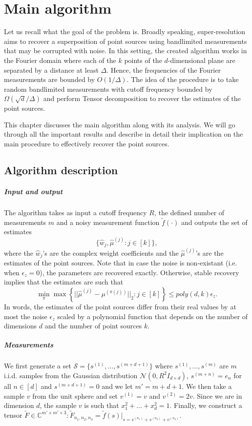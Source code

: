 \chapter{Main algorithm}
Let us recall what the goal of the problem is. Broadly speaking, super-resolution aims to recover a superposition of point sources using bandlimited measurements that may be corrupted with noise. In this setting, the created algorithm works in the Fourier domain where each of the $k$ points of the $d$-dimensional plane are separated by a distance at least $\Delta$. Hence, the frequencies of the Fourier measurements are bounded by $O(1/\Delta)$. The idea of the procedure is to take random bandlimited measurements with cutoff frequency bounded by $\Omega(\sqrt{d}/\Delta)$ and perform Tensor decomposition to recover the estimates of the point sources.\par 
This chapter discusses the main algorithm along with its analysis. We will go through all the important results and describe in detail their implication on the main procedure to effectively recover the point sources.

\section{Algorithm description}
\paragraph{Input and output} The algorithm takes as input a cutoff frequency $R$, the defined number of measurements $m$ and a noisy measurement function $\tilde{f}(\cdot)$ and outputs the set of estimates $$\{\widehat{w}_j,\widehat{\mu}^{(j)}:j\in[k]\},$$ where the $\widehat{w}_j$'s are the complex weight coefficients and the $\widehat{\mu}^{(j)}$'s are the estimates of the point sources. Note that in case the noise is non-existant (i.e. when $\epsilon_z=0$), the parameters are recovered exactly. Otherwise, stable recovery implies that the estimates are such that $$\min_\pi\max\left\{||\widehat{\mu}^{(j)}-\mu^{(\pi(j))}||_2:j\in[k]\right\}\leq poly(d,k)\epsilon_z.$$ In words, the estimates of the point sources differ from their real values by at most the noise $\epsilon_z$ scaled by a polynomial function that depends on the number of dimensions $d$ and the number of point sources $k$.
\paragraph{Measurements} We first generate a set $\mathcal{S}=\{s^{(1)},\ldots,s^{(m+d+1)}\}$ where $s^{(1)},\ldots,s^{(m)}$ are $m$ i.i.d. samples from the Gaussian distribution $\mathcal{N}(0,R^2I_{d\times d})$, $s^{(m+n)}=e_n$ for all $n\in[d]$ and $s^{(m+d+1)}=0$ and we let $m'=m+d+1$. We then take a sample $v$ from the unit sphere and set $v^{(1)}=v$ and $v^{(2)}=2v$. Since we are in dimension $d$, the sample $v$ is such that $x_1^2+\ldots+x_d^2=1$. Finally, we construct a tensor $\tilde{F}\in\mathbb{C}^{m'\times m'\times 3}:\tilde{F}_{n_1,n_2,n_3}=\tilde{f}(s)|_{s=s^{(n_1)}+s^{(n_2)}+v^{(n_3)}}$.
